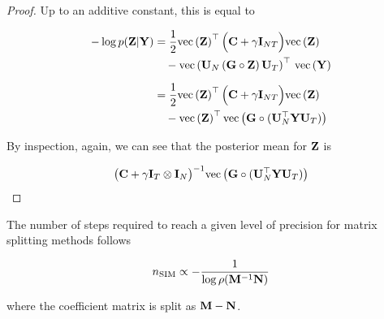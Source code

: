 \begin{proof}
    Up to an additive constant, this is equal to 
    
    \begin{align*}
    -\log p(\mathbf{Z} | \mathbf{Y}) &= \frac{1}{2} \text{\textup{vec}}\left(\mathbf{Z}\right)^\top \Big(\mathbf{C} + \gamma \mathbf{I}_{NT}\Big) \text{\textup{vec}}\left(\mathbf{Z}\right) \\ & \quad - \text{\textup{vec}}\left(\mathbf{U}_N \, (\mathbf{G} \circ \mathbf{Z}) \, \mathbf{U}_T\right)^\top \,  \text{\textup{vec}}\left(\mathbf{Y}\right) \\[0.2cm]
    &= \frac{1}{2} \text{\textup{vec}}\left(\mathbf{Z}\right)^\top \Big(\mathbf{C} + \gamma \mathbf{I}_{NT}\Big) \text{\textup{vec}}\left(\mathbf{Z}\right) \\ & \quad - \text{\textup{vec}}\left(\mathbf{Z}\right)^\top\text{\textup{vec}}\left(\mathbf{G} \circ (\mathbf{U}_N^\top \mathbf{Y} \mathbf{U}_T)\right)
    \end{align*}
    
    By inspection, again, we can see that the posterior mean for $\mathbf{Z}$ is 
    
    $$
    \big( \mathbf{C} + \gamma \mathbf{I}_T \otimes \mathbf{I}_N \big)^{-1}\text{\textup{vec}}\left(\mathbf{G} \circ (\mathbf{U}_N^\top \mathbf{Y} \mathbf{U}_T)\right) 
    $$
    
    
    
    \end{proof}
    

\begin{theorem}
    \label{the:SIM_convergence}
    The number of steps required to reach a given level of precision for matrix splitting methods follows 

    \begin{equation}
        n_{\text{SIM}} \propto -\frac{1}{\log \rho(\mathbf{M}^{-1}\mathbf{N})}
    \end{equation}

    where the coefficient matrix is split as $\mathbf{M} - \mathbf{N}$. 
\end{theorem}

